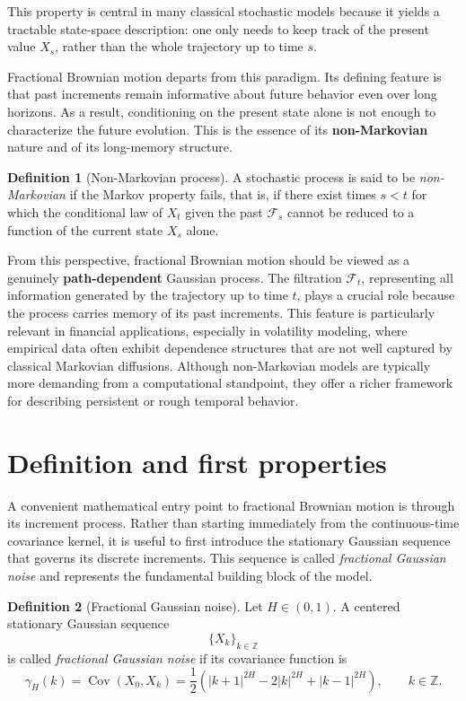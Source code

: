 \documentclass[a4paper,10pt,titlepage,oneside,openany]{book}
\theoremstyle{plain}
\theoremstyle{definition}
\newtheorem{definition}{Definition}[chapter]
\theoremstyle{remark}
\newcommand{\Cov}{\operatorname{Cov}}
\newcommand{\1}{\mathbf{1}}
\begin{document}
This property is central in many classical stochastic models because it yields a tractable state-space description: one only needs to keep track of the present value \(X_s\), rather than the whole trajectory up to time \(s\).

Fractional Brownian motion departs from this paradigm. Its defining feature is that past increments remain informative about future behavior even over long horizons. As a result, conditioning on the present state alone is not enough to characterize the future evolution. This is the essence of its \textbf{non-Markovian} nature and of its long-memory structure.

\begin{definition}[Non-Markovian process]
A stochastic process is said to be \emph{non-Markovian} if the Markov property fails, that is, if there exist times \(s<t\) for which the conditional law of \(X_t\) given the past \(\mathcal{F}_s\) cannot be reduced to a function of the current state \(X_s\) alone.
\end{definition}

From this perspective, fractional Brownian motion should be viewed as a genuinely \textbf{path-dependent} Gaussian process. The filtration \(\mathcal{F}_t\), representing all information generated by the trajectory up to time \(t\), plays a crucial role because the process carries memory of its past increments. This feature is particularly relevant in financial applications, especially in volatility modeling, where empirical data often exhibit dependence structures that are not well captured by classical Markovian diffusions. Although non-Markovian models are typically more demanding from a computational standpoint, they offer a richer framework for describing persistent or rough temporal behavior.

\section{Definition and first properties}

A convenient mathematical entry point to fractional Brownian motion is through its increment process. Rather than starting immediately from the continuous-time covariance kernel, it is useful to first introduce the stationary Gaussian sequence that governs its discrete increments. This sequence is called \emph{fractional Gaussian noise} and represents the fundamental building block of the model.

\begin{definition}[Fractional Gaussian noise]
Let \(H\in(0,1)\). A centered stationary Gaussian sequence
\[
\{X_k\}_{k\in\mathbb{Z}}
\]
is called \emph{fractional Gaussian noise} if its covariance function is
\[
\gamma_H(k)
=
\Cov(X_0,X_k)
=
\frac{1}{2}
\left(
|k+1|^{2H}
-
2|k|^{2H}
+
|k-1|^{2H}
\right),
\qquad k\in\mathbb{Z}.
\]
\end{definition}
\end{document}
